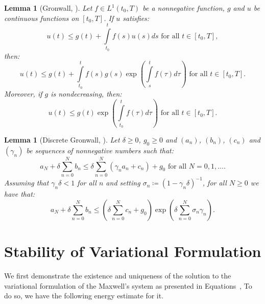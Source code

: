 \documentclass{amsart}
\theoremstyle{thmstyleone}%
\theoremstyle{thmstyletwo}%
\theoremstyle{thmstylethree}%
\newtheorem{lemma}[theorem]{Lemma}
\begin{document}
\begin{lemma}[Gronwall, {\cite[Lemma 1.4.1]{QuVa1994}}] \label{lemma:gronwall}
  Let $f \in L^1(t_0, T)$ be a nonnegative function, $g$ and $u$ be continuous functions on $[t_0, T]$. If $u$ satisfies:
  \[
    u(t) \le g(t) + \int\limits_{t_0}^t f(s) u(s) ds \text{ for all } t \in [t_0, T],
  \]
  then:
  \[
    u(t) \le g(t) + \int\limits_{t_0}^t f(s) g(s) \exp\left( \int\limits_{s}^t f(\tau) d\tau \right) \text{ for all } t \in [t_0, T].
  \]
  Moreover, if $g$ is nondecreasing, then:
  \[
    u(t) \le g(t) \exp \left( \int\limits_{t_0}^t f(\tau) d\tau \right) \text{ for all } t \in [t_0, T].
  \]  
\end{lemma}

\begin{lemma}[Discrete Gronwall, {\cite[Lemma 2]{AnAn2019}}] \label{lemma:gronwall_dscrt}
  Let $\delta \ge 0$, $g_0 \ge 0$ and $(a_n)$, $(b_n)$, $(c_n)$ and $(\gamma_n)$ be sequences of nonnegative numbers such that:
  \[
    a_N + \delta \sum\limits_{n = 0}^N b_n \le \delta \sum\limits_{n = 0}^{N} \left( \gamma_n a_n + c_n \right) + g_0 \text{ for all } N = 0, 1, \dots.
  \]
  Assuming that $\gamma_n \delta < 1$ for all $n$ and setting $\sigma_n \coloneq \left( 1 - \gamma_n \delta \right)^{-1}$, for all $N \ge 0$ we have that:
  \[
    a_N + \delta \sum\limits_{n = 0}^N b_n \le \left( \delta \sum\limits_{n = 0}^N c_n + g_0 \right) \exp \left( \delta \sum\limits_{n = 0}^N \sigma_n \gamma_n \right).
  \]
\end{lemma}

  
\section{Stability of Variational Formulation} \label{sec:stability_wf}

We first demonstrate the existence and uniqueness of the solution to the variational formulation of the Maxwell's system as presented in Equations~, To do so, we have the following energy estimate for it.
\end{document}
